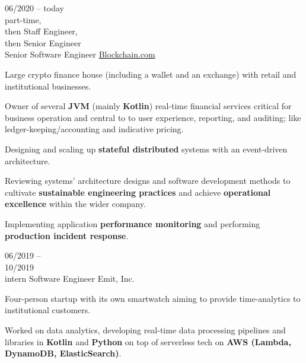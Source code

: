 \begin{entrylist}
    \entry
    {
        06/2020 -- today\\\footnotesize{part-time,\\ then Staff Engineer,\\ then Senior Engineer}\\
    }
    {Senior Software Engineer}
    {\href{https://blockchain.com/about}{Blockchain.com}}
    {
        Large crypto finance house (including a wallet and an exchange) with retail and
    institutional businesses.

    \para
    Owner of several \textbf{JVM} (mainly \textbf{Kotlin}) real-time financial services critical for business operation and central to
    to user experience, reporting, and auditing; like ledger-keeping/accounting and indicative pricing.

    \para
    Designing and scaling up \textbf{stateful distributed} systems with an event-driven architecture.

    \para
    Reviewing systems' architecture designs and software development methods to cultivate \textbf{sustainable engineering practices}
    and achieve \textbf{operational excellence} within the wider company.

    \para
    Implementing application \textbf{performance monitoring} and performing \textbf{production incident response}.


    }
    \entry
    {06/2019 -- \\ 10/2019\\\footnotesize{intern}}
    {Software Engineer}
    {Emit, Inc.}
    {
        Four-person startup with its own smartwatch aiming to provide time-analytics to
        institutional customers.

        \para
        Worked on data analytics, developing real-time data processing pipelines and libraries in
    \textbf{Kotlin} and \textbf{Python} on top of serverless tech on \textbf{AWS (Lambda,
        DynamoDB, ElasticSearch)}.
    }
\end{entrylist}
